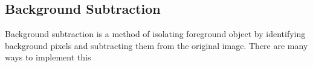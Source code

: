 \subsection{Background Subtraction}

Background subtraction is a method of isolating foreground object by identifying background pixels and subtracting them from the original image. There are many ways to implement this 